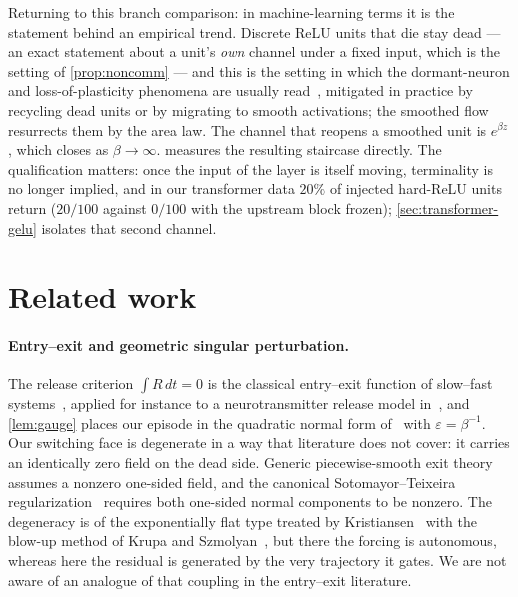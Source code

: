 \documentclass[11pt]{article}
\theoremstyle{definition}
\theoremstyle{remark}
\begin{document}
Returning to this branch comparison: in machine-learning terms it is the
statement behind an empirical trend. Discrete ReLU units that die stay dead --- an exact statement
about a unit's \emph{own} channel under a fixed input, which is the setting of
\cref{prop:noncomm} --- and this is the setting in which the dormant-neuron and
loss-of-plasticity phenomena are usually read~\cite{Sokar23,Lyle23,Dohare24},
mitigated in practice by recycling dead units or by migrating to smooth
activations; the smoothed flow resurrects them by the area law. The channel that
reopens a smoothed unit is $e^{\beta z}$, which closes as $\beta\to\infty$.
 measures the resulting staircase directly. The
qualification matters: once the input of the layer is itself moving, terminality
is no longer implied, and in our transformer data $20\%$ of injected hard-ReLU
units return ($20/100$ against $0/100$ with the upstream block frozen);
\cref{sec:transformer-gelu} isolates that second channel.

\section{Related work}\label{sec:related}

\paragraph{Entry--exit and geometric singular perturbation.}
The release criterion $\int R\,dt=0$ is the classical entry--exit function of
slow--fast systems~\cite[Theorem 1.1]{DMS16}, applied for instance to a
neurotransmitter release model in~\cite{SDR23}, and \cref{lem:gauge} places our
episode in the quadratic normal form of~\cite[equations~(1.9)--(1.10)]{DMS16} with
$\varepsilon=\beta^{-1}$. Our switching face is degenerate in a way that
literature does not cover: it carries an identically zero field on the dead side.
Generic piecewise-smooth exit theory~\cite{Jef16,GH15,GH22} assumes a nonzero
one-sided field, and the canonical Sotomayor--Teixeira
regularization~\cite{ST98,LST07} requires both one-sided normal components to be
nonzero. The degeneracy is of the exponentially flat type treated by
Kristiansen~\cite{Kri17} with the blow-up method of Krupa and
Szmolyan~\cite{KS01}, but there the forcing is autonomous, whereas here the
residual is generated by the very trajectory it gates. We are not aware of an
analogue of that coupling in the entry--exit literature.
\end{document}
